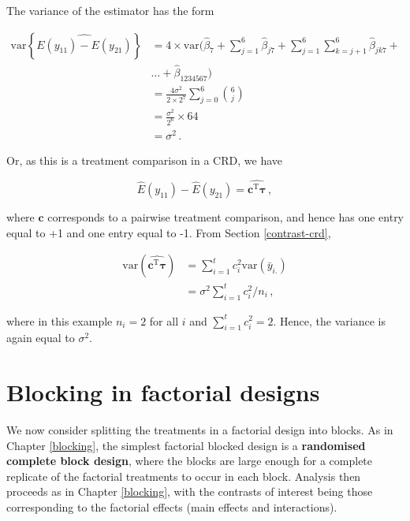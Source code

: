 \documentclass[
]{book}
\theoremstyle{definition}
\theoremstyle{definition}
\theoremstyle{definition}
\theoremstyle{definition}
\theoremstyle{remark}
\begin{document}
\begin{enumerate}
  The variance of the estimator has the form

  \begin{align*}
  \mathrm{var}\left\{\widehat{E(y_{11}) - E(y_{21})}\right\} & = 4\times\mathrm{var}\bigg(\hat{\beta}_7 + \sum_{j=1}^6\hat{\beta}_{j7} + \sum_{j=1}^6\sum_{k=j+1}^6\hat{\beta}_{jk7} + \\
  & \ldots + \hat{\beta}_{1234567}\bigg) \\
  & = \frac{4\sigma^2}{2\times 2^7}\sum_{j=0}^6{6 \choose j} \\
  & = \frac{\sigma^2}{2^6}\times 64 \\
  & = \sigma^2\,.
  \end{align*}

  Or, as this is a treatment comparison in a CRD, we have

  \[
   \hat{E}(y_{11}) - \hat{E}(y_{21}) = \widehat{\boldsymbol{c}^{\mathrm{T}}\boldsymbol{\tau}}\,,
  \]

  where \(\boldsymbol{c}\) corresponds to a pairwise treatment comparison, and hence has one entry equal to +1 and one entry equal to -1. From Section \ref{contrast-crd},

  \begin{align*}
  \mathrm{var}\left(\widehat{\boldsymbol{c}^{\mathrm{T}}\boldsymbol{\tau}}\right) 
  & = \sum_{i=1}^tc_i^2\mathrm{var}(\bar{y}_{i.}) \\
  & = \sigma^2\sum_{i=1}^tc_i^2/n_i\,,
  \end{align*}

  where in this example \(n_i = 2\) for all \(i\) and \(\sum_{i=1}^tc_i^2 = 2\). Hence, the variance is again equal to \(\sigma^2\).
\end{enumerate}

\hypertarget{block-factorial}{%
\chapter{Blocking in factorial designs}\label{block-factorial}}

We now consider splitting the treatments in a factorial design into blocks. As in Chapter \ref{blocking}, the simplest factorial blocked design is a \textbf{randomised complete block design}, where the blocks are large enough for a complete replicate of the factorial treatments to occur in each block. Analysis then proceeds as in Chapter \ref{blocking}, with the contrasts of interest being those corresponding to the factorial effects (main effects and interactions).
\end{document}
